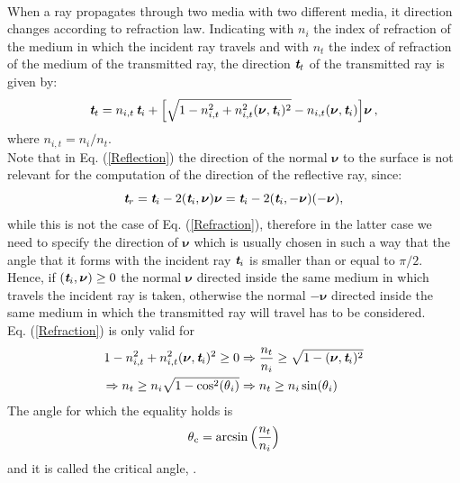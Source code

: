 \\ When a ray propagates through two media with two different media, it direction changes according to refraction law. 
Indicating with $n_i$ the index of refraction of the medium in which the incident ray travels and with $n_t$ the index of refraction of the medium of the transmitted ray, the direction $\textit{\textbf{t}}_t$ of the transmitted ray is given by:
\begin{equation}\label{Refraction}
\textit{\textbf{t}}_t = n_{i,t}\,\textit{\textbf{t}}_i+
\Big[\sqrt{1-n_{i,t}^2+n_{i,t}^2(\boldsymbol{\nu},\textit{\textbf{t}}_i)^2}-n_{i,t}(\boldsymbol{\nu},\textit{\textbf{t}}_i) \Big]\boldsymbol{\nu}\,,
\end{equation}
where $n_{i,t}=n_i/n_t$. \\
 \indent Note that in Eq. (\ref{Reflection}) the direction of the normal $\boldsymbol{\nu}$ to the surface is not relevant for the computation of the direction of the reflective ray, since:
\begin{equation}
\textit{\textbf{t}}_r = \textit{\textbf{t}}_i-2(\textit{\textbf{t}}_i,\boldsymbol{\nu})\boldsymbol{\nu}= \textit{\textbf{t}}_i-2(\textit{\textbf{t}}_i,-\boldsymbol{\nu})(-\boldsymbol{\nu}) ,
\end{equation}
while this is not the case of Eq. (\ref{Refraction}), therefore in the latter case we need to specify the direction of $\boldsymbol{\nu}$ which is usually chosen in such a way that the angle that it forms with the incident ray $\textit{\textbf{t}}_i$ is smaller than or equal to $\pi/2$. Hence, if $(\textit{\textbf{t}}_i, \boldsymbol{\nu})\geq0$ the normal $\boldsymbol{\nu}$ directed inside the same medium in which travels the incident ray is taken, otherwise the normal $-\boldsymbol{\nu}$ directed inside the same medium in which the transmitted ray will travel has to be considered. \\ \indent
Eq. (\ref{Refraction}) is only valid for 
\begin{equation}\label{tir}\begin{split}
1-n_{i,t}^2+n_{i,t}^2(\boldsymbol{\nu},\textit{\textbf{t}}_i)^2\geq 0 & \Rightarrow \frac{n_t}{n_i}\geq \sqrt{1-(\boldsymbol{\nu},\textit{\textbf{t}}_i)^2}\\
\Rightarrow n_t\geq n_i\sqrt{1-\cos^2(\mbox{$\theta$}_i)} & \Rightarrow  n_t\geq n_i \sin(\mbox{$\theta$}_i)
\end{split}
\end{equation}
 The angle for which the equality holds is
\begin{equation}\label{critical}
\mbox{$\theta$}_{\textrm{c}} = \arcsin\Big(\frac{n_t}{n_i}\Big)
\end{equation} and it is called the critical angle, \cite{chaves2015introduction}.
